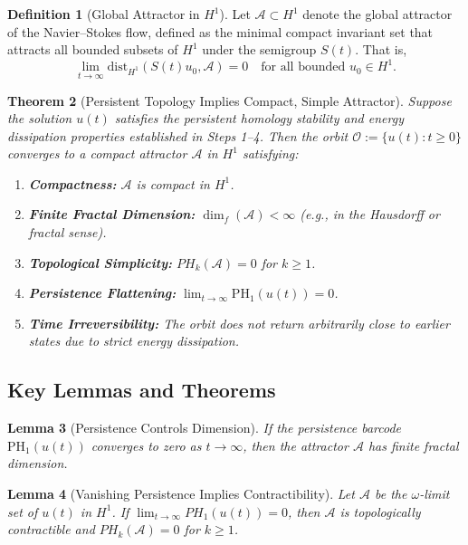 \documentclass[11pt]{article}
\newtheorem{theorem}{Theorem}[section]
\newtheorem{lemma}[theorem]{Lemma}
\theoremstyle{definition}
\newtheorem{definition}[theorem]{Definition}
\begin{document}
\begin{definition}[Global Attractor in $H^1$]
Let $\mathcal{A} \subset H^1$ denote the global attractor of the Navier--Stokes flow, defined as the minimal compact invariant set that attracts all bounded subsets of $H^1$ under the semigroup $S(t)$. That is,
\[
\lim_{t \to \infty} \mathrm{dist}_{H^1}(S(t)u_0, \mathcal{A}) = 0 \quad \text{for all bounded } u_0 \in H^1.
\]
\end{definition}

\begin{theorem}[Persistent Topology Implies Compact, Simple Attractor]
\label{thm:attractor_persistence}
Suppose the solution $u(t)$ satisfies the persistent homology stability and energy dissipation properties established in Steps 1--4. Then the orbit $\mathcal{O} := \{u(t): t \ge 0\}$ converges to a compact attractor $\mathcal{A}$ in $H^1$ satisfying:
\begin{enumerate}
  \item \textbf{Compactness:} $\mathcal{A}$ is compact in $H^1$.
  \item \textbf{Finite Fractal Dimension:} $\dim_f(\mathcal{A}) < \infty$ (e.g., in the Hausdorff or fractal sense).
  \item \textbf{Topological Simplicity:} $PH_k(\mathcal{A}) = 0$ for $k \ge 1$.
  \item \textbf{Persistence Flattening:} $\lim_{t \to \infty} \mathrm{PH}_1(u(t)) = 0$.
  \item \textbf{Time Irreversibility:} The orbit does not return arbitrarily close to earlier states due to strict energy dissipation.
\end{enumerate}
\end{theorem}

\subsection*{Key Lemmas and Theorems}

\begin{lemma}[Persistence Controls Dimension]
If the persistence barcode $\mathrm{PH}_1(u(t))$ converges to zero as $t \to \infty$, then the attractor $\mathcal{A}$ has finite fractal dimension.
\end{lemma}

\begin{lemma}[Vanishing Persistence Implies Contractibility]
Let $\mathcal{A}$ be the $\omega$-limit set of $u(t)$ in $H^1$. If $\lim_{t \to \infty} PH_1(u(t)) = 0$, then $\mathcal{A}$ is topologically contractible and $PH_k(\mathcal{A}) = 0$ for $k \ge 1$.
\end{lemma}
\end{document}
